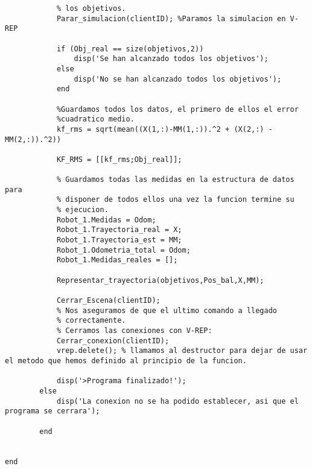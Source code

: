 \begin{lstlisting}[frame=single]
            % Comprobamos que durante la simulacion hemos alcanzado todos
            % los objetivos.
            Parar_simulacion(clientID); %Paramos la simulacion en V-REP
            
            if (Obj_real == size(objetivos,2))
                disp('Se han alcanzado todos los objetivos');
            else 
                disp('No se han alcanzado todos los objetivos');
            end

            %Guardamos todos los datos, el primero de ellos el error
            %cuadratico medio.
            kf_rms = sqrt(mean((X(1,:)-MM(1,:)).^2 + (X(2,:) - MM(2,:)).^2))

            KF_RMS = [[kf_rms;Obj_real]];
            
            % Guardamos todas las medidas en la estructura de datos para
            % disponer de todos ellos una vez la funcion termine su
            % ejecucion.
            Robot_1.Medidas = Odom;
            Robot_1.Trayectoria_real = X;
            Robot_1.Trayectoria_est = MM;
            Robot_1.Odometria_total = Odom;
            Robot_1.Medidas_reales = [];

            Representar_trayectoria(objetivos,Pos_bal,X,MM);
            
            Cerrar_Escena(clientID);
            % Nos aseguramos de que el ultimo comando a llegado
            % correctamente.
            % Cerramos las conexiones con V-REP:	
            Cerrar_conexion(clientID);
            vrep.delete(); % llamamos al destructor para dejar de usar el metodo que hemos definido al principio de la funcion.

            disp('>Programa finalizado!');
        else
            disp('La conexion no se ha podido establecer, asi que el programa se cerrara');

        end

    
end
\end{lstlisting}
